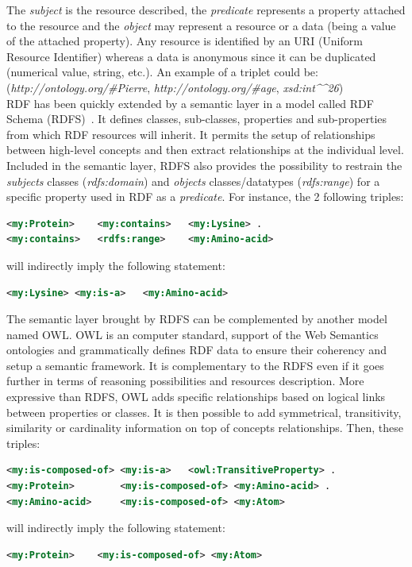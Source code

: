 \documentclass{vgtc}                          %
\begin{document}
The \textit{subject} is the resource described, the \textit{predicate} represents a property attached to the resource and the \textit{object} may represent a resource or a data (being a value of the attached property). Any resource is identified by an URI (Uniform Resource Identifier) whereas a data is anonymous since it can be duplicated (numerical value, string, etc.). An example of a triplet could be:
\\
(\textit{http://ontology.org/\#Pierre}, \textit{http://ontology.org/\#age}, \textit{xsd:int\^{}\^{}26})
\\
RDF has been quickly extended by a semantic layer in a model called RDF Schema (RDFS)~\cite{brickley2004rdf}. It defines classes, sub-classes, properties and sub-properties from which RDF resources will inherit. It permits the setup of relationships between high-level concepts and then extract relationships at the individual level. Included in the semantic layer, RDFS also provides the possibility to restrain the \textit{subjects} classes (\textit{rdfs:domain}) and \textit{objects} classes/datatypes (\textit{rdfs:range}) for a specific property used in RDF as a \textit{predicate}.
For instance, the 2 following triples:
\begin{lstlisting}[language=XML]
<my:Protein>	<my:contains>	<my:Lysine> .
<my:contains>	<rdfs:range>	<my:Amino-acid>
\end{lstlisting}
\noindent
will indirectly imply the following statement:
\begin{lstlisting}[language=XML]
<my:Lysine>	<my:is-a>	<my:Amino-acid>
\end{lstlisting}
\noindent

The semantic layer brought by RDFS can be complemented by another model named OWL. OWL is an computer standard, support of the Web Semantics ontologies and grammatically defines RDF data to ensure their coherency and setup a semantic framework. It is complementary to the RDFS even if it goes further in terms of reasoning possibilities and resources description. More expressive than RDFS, OWL adds specific relationships based on logical links between properties or classes. It is then possible to add symmetrical, transitivity, similarity or cardinality information on top of concepts relationships.
Then, these triples:
\begin{lstlisting}[language=XML]
<my:is-composed-of>	<my:is-a>	<owl:TransitiveProperty> .
<my:Protein>		<my:is-composed-of>	<my:Amino-acid> .
<my:Amino-acid>		<my:is-composed-of>	<my:Atom>
\end{lstlisting}
will indirectly imply the following statement:
\begin{lstlisting}[language=XML]
<my:Protein>	<my:is-composed-of>	<my:Atom>
\end{lstlisting}
\end{document}
